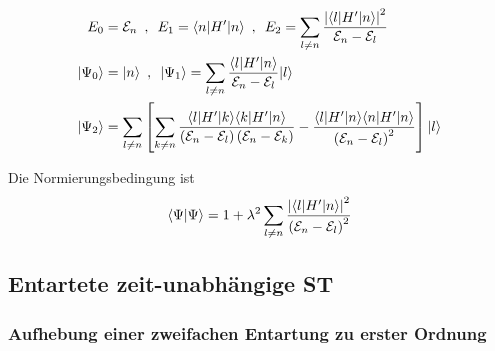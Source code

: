 \begin{align*}
    E_0 &= \mathcal{E}_n
    \hspace{5pt} , \hspace{5pt}
    E_1 = \langle n | H' | n \rangle
    \hspace{5pt} , \hspace{5pt}
    E_2 = \sum_{l \neq n} \frac{\left\vert \langle l | H' | n \rangle \right\vert^2}{\mathcal{E}_n - \mathcal{E}_l}
    \\
    | \Psi_0 \rangle &= |n\rangle
    \hspace{5pt} , \hspace{5pt}
    | \Psi_1 \rangle = \sum_{l \neq n} \frac{\langle l | H' | n \rangle}{\mathcal{E}_n - \mathcal{E}_l} | l \rangle
    \\
    | \Psi_2 \rangle &= \sum_{l \neq n} \left[ 
        \sum_{k \neq n} \frac{\langle l | H' | k \rangle \langle k | H' | n \rangle}{\left( \mathcal{E}_n - \mathcal{E}_l \right) \left( \mathcal{E}_n - \mathcal{E}_k \right)}
        - \frac{\langle l | H' | n \rangle \langle n | H' | n \rangle}{\left( \mathcal{E}_n - \mathcal{E}_l \right)^2}
     \right] |l\rangle
\end{align*}

Die Normierungsbedingung ist
\begin{align*}
    \left\langle \Psi | \Psi \right\rangle = 1 + \lambda^2
    \sum_{l \neq n} \frac{\left\vert \left\langle l | H' | n \right\rangle \right\vert^2}{\left( \mathcal{E}_n - \mathcal{E}_l \right)^2}
\end{align*}

\subsection{Entartete zeit-unabhängige ST}

\subsubsection{Aufhebung einer zweifachen Entartung zu erster Ordnung}

